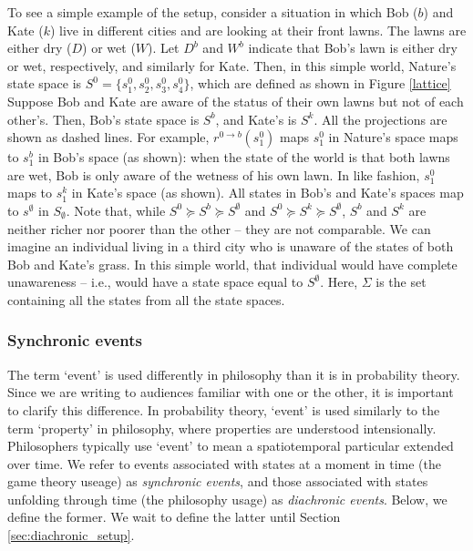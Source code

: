 \documentclass[
11pt,
titlepage,
reqno,
]{article}%
\theoremstyle{definition}
\begin{document}
	To see a simple example of the setup, consider a situation in which  Bob ($b$) and Kate ($k$) live in different cities and are looking at their front lawns. 
	The lawns are either dry ($D$) or wet ($W$).
	Let $D^b$ and $W^b$ indicate that Bob's lawn is either dry or wet, respectively, and similarly for Kate. 
	Then, in this simple world, Nature's state space is $S^0=\{s^0_1,s^0_2,s^0_3,s^0_4\}$, which are defined as shown in Figure \ref{lattice}
	Suppose Bob and Kate are aware of the status of their own lawns but not of each other's.
	Then, Bob's state space is $S^b$, and Kate's is $S^k$.
	All the projections are shown as dashed lines.
	For example,  $r^{0\rightarrow b}(s^0_1)$ maps $s^0_1$ in Nature's space maps to $s^b_1$ in Bob's space (as shown): when the state of the world is that both lawns are wet, Bob is only aware of the wetness of his own lawn.
	In like fashion, $s^0_1$ maps to $s^k_1$ in Kate's space (as shown).
	All states in Bob's and Kate's spaces map to $s^\emptyset$ in $S_\emptyset$.
	Note that, while $S^0\succeq S^b\succeq S^\emptyset$ and $S^0\succeq S^k\succeq S^\emptyset$, $S^b$ and $S^k$ are neither richer nor poorer than the other -- they are not comparable.
	We can imagine an individual living in a third city who is unaware of the states of both Bob and Kate's grass.
	In this simple world, that individual would have complete unawareness -- i.e., would have a state space equal to $S^\emptyset$.
	Here, $\Sigma$ is the set containing all the states from all the state spaces.


	\subsubsection{Synchronic events}

	The term `event' is used differently in philosophy than it is in probability theory. 
	Since we are writing to audiences familiar with one or the other, it is important to clarify this difference. 
	In probability theory, `event' is used similarly to the term `property' in philosophy, where properties are understood intensionally. 
	Philosophers typically use `event' to mean a spatiotemporal particular extended over time. 
	We refer to events associated with states at a moment in time (the game theory useage) as \textit{synchronic events}, and those associated with states unfolding through time (the philosophy usage) as \textit{diachronic events}.
	Below, we define the former.
	We wait to define the latter until Section \ref{sec:diachronic_setup}.
	
\end{document}

